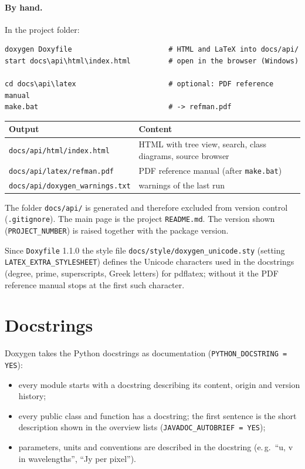 \paragraph*{By hand.} In the project folder:
\begin{lstlisting}[basicstyle=\ttfamily\footnotesize, frame=single]
doxygen Doxyfile                       # HTML and LaTeX into docs/api/
start docs\api\html\index.html         # open in the browser (Windows)

cd docs\api\latex                      # optional: PDF reference manual
make.bat                               # -> refman.pdf
\end{lstlisting}

\begin{center}
\begin{tabular}{@{}ll@{}}
\toprule
Output & Content \\
\midrule
\texttt{docs/api/html/index.html} & HTML with tree view, search, class
  diagrams, source browser \\
\texttt{docs/api/latex/refman.pdf} & PDF reference manual (after
  \texttt{make.bat}) \\
\texttt{docs/api/doxygen\_warnings.txt} & warnings of the last run \\
\bottomrule
\end{tabular}
\end{center}

The folder \texttt{docs/api/} is generated and therefore excluded from
version control (\texttt{.gitignore}). The main page is the project
\texttt{README.md}. The version shown (\texttt{PROJECT\_NUMBER}) is
raised together with the package version.

Since \texttt{Doxyfile} 1.1.0 the style file
\texttt{docs/style/doxygen\_unicode.sty} (setting
\texttt{LATEX\_EXTRA\_STYLESHEET}) defines the Unicode characters used in
the docstrings (degree, prime, superscripts, Greek letters) for pdflatex;
without it the PDF reference manual stops at the first such character.

\section{Docstrings}

Doxygen takes the Python docstrings as documentation
(\texttt{PYTHON\_DOCSTRING = YES}):
\begin{itemize}
  \item every module starts with a docstring describing its content,
        origin and version history;
  \item every public class and function has a docstring; the first
        sentence is the short description shown in the overview lists
        (\texttt{JAVADOC\_AUTOBRIEF = YES});
  \item parameters, units and conventions are described in the
        docstring (e.\,g.\ \enquote{u, v in wavelengths}, \enquote{Jy per
        pixel}).
\end{itemize}
